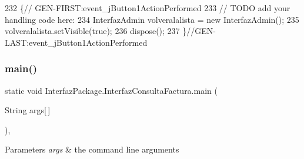 \begin{DoxyCode}
232                                                                          \{\textcolor{comment}{//
      GEN-FIRST:event\_jButton1ActionPerformed}
233         \textcolor{comment}{// TODO add your handling code here:}
234         InterfazAdmin volveralalista = \textcolor{keyword}{new} InterfazAdmin();
235         volveralalista.setVisible(\textcolor{keyword}{true});
236         dispose();
237     \}\textcolor{comment}{//GEN-LAST:event\_jButton1ActionPerformed}
\end{DoxyCode}
\mbox{\label{class_interfaz_package_1_1_interfaz_consulta_factura_a8a390d26acfd0f9ee484c817224cad35}} 
\subsubsection{\texorpdfstring{main()}{main()}}
{\footnotesize\ttfamily static void Interfaz\+Package.\+Interfaz\+Consulta\+Factura.\+main (\begin{DoxyParamCaption}\item[{String}]{args\mbox{[}$\,$\mbox{]} }\end{DoxyParamCaption})\hspace{0.3cm}{\ttfamily [inline]}, {\ttfamily [static]}}


\begin{DoxyParams}{Parameters}
{\em args} & the command line arguments \\
\hline
\end{DoxyParams}

